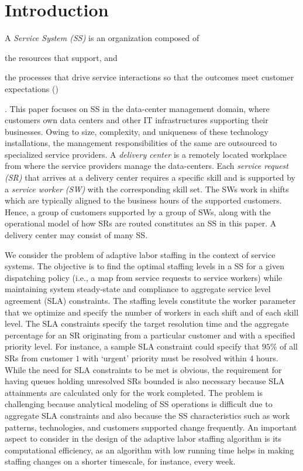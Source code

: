 \documentclass[11pt,letterpaper,english]{article}
\begin{document}



\section{Introduction}
A \emph{Service System (SS)} is an organization composed
of \begin{inparaenum}[(i)] \item the resources that support, and \item
  the processes that drive service interactions so that the outcomes
  meet customer expectations
  (\citep{alter2008service,spohrer2007steps})\end{inparaenum}. This
paper focuses on SS in the data-center management domain, where
customers own data centers and other IT infrastructures supporting
their businesses.  Owing to size, complexity, and uniqueness of these
technology installations, the management responsibilities of the same
are outsourced to specialized service providers.  A \emph{delivery
  center} is a remotely located workplace from where the service
providers manage the data-centers.  Each \emph{service request (SR)}
that arrives at a delivery center requires a specific skill and is
supported by a \emph{service worker (SW)} with the corresponding
skill set.  The SWs work in shifts which are typically aligned to the
business hours of the supported customers.  Hence, a group of
customers supported by a group of SWs, along with the operational
model of how SRs are routed constitutes an SS in this paper.  A
delivery center may consist of many SS.

We consider the problem of adaptive labor staffing in the context of
service systems. The objective is to find the optimal staffing levels
in a SS for a given dispatching policy (i.e., a map from service requests
to service workers) while maintaining system steady-state and
compliance to aggregate service level agreement (SLA) constraints.
The staffing levels constitute the worker parameter that we optimize and specify the number of workers in each shift and of each skill level.
The SLA constraints specify the target resolution time and the
aggregate percentage for an SR originating from a particular customer
and with a specified priority level. For instance, a sample SLA
constraint could specify that $95\%$ of all SRs from customer $1$ with
`urgent' priority must be resolved within $4$ hours. While the need for
SLA constraints to be met is obvious, the requirement for having
queues holding unresolved SRs bounded is also necessary because SLA
attainments are calculated only for the work completed. The problem is
challenging because analytical modeling of SS operations is difficult
due to aggregate SLA constraints and also because the SS
characteristics such as work patterns, technologies, and customers
supported change frequently. An important aspect to consider in the design of the adaptive labor staffing algorithm is its computational efficiency, as an algorithm with low running time helps in making staffing changes on a shorter timescale, for instance, every week.
\end{document}
